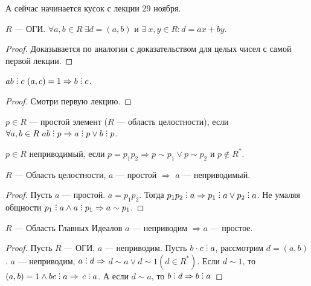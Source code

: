 А сейчас начинается кусок с лекции 29 ноября.
\begin{statement}
    $R$ --- ОГИ.  $\forall a, b \in R \  \exists d = (a, b)$ и  $\exists\!\  x, y \in R: d = ax+by$.
\end{statement}
\begin{proof}
    Доказывается по аналогии с доказательством для целых чисел с самой первой лекции.
\end{proof}
\begin{statement}
    $ab \divby c\ (a, c) = 1 \Rightarrow b \divby c$.
\end{statement}
\begin{proof}
    Смотри первую лекцию.
\end{proof}
\begin{definition}
    $p \in R$ --- простой элемент ($R$ --- область целостности), если $\forall a,b \in R\ ab \divby p \Rightarrow a \divby p \lor b \divby p$.
\end{definition}
\begin{definition}
    $p \in R$ неприводимый, если  $p=p_1p_2 \Rightarrow p \sim p_1 \lor p \sim p_2$ и $p \notin R^*$.
\end{definition}
\begin{statement}
    $R$ --- Область целостности, $a$ --- простой  $\Rightarrow$  $a$ --- неприводимый.
\end{statement}
\begin{proof}
	Пусть $a$ --- простой.  $a = p_1 p_2$. Тогда $p_1 p_2 \divby a \Rightarrow p_1 \divby a \lor p_2 \divby a$.  Не умаляя общности $p_1 \divby a \land a \divby p_1 \Rightarrow a \sim p_1$. 
\end{proof}

\begin{statement}
     $R$ --- Область Главных Идеалов  $a$ --- неприводим  $\Rightarrow a$ --- простое.
\end{statement}
\begin{proof}
	Пусть $R$ --- ОГИ,  $a$ --- неприводим. Пусть $b \cdot c \divby a$, рассмотрим $d = (a, b)$. $a$ --- неприводим, $a \divby d \Rightarrow$ $d \sim a \lor d \sim 1 (d \in R^*)$. Если $d \sim 1$, то $(a, b) = 1 \land b c \divby a \Rightarrow$ $c \divby a$. А если $d \sim a$, то $b \divby d \Rightarrow b \divby a$
\end{proof}

